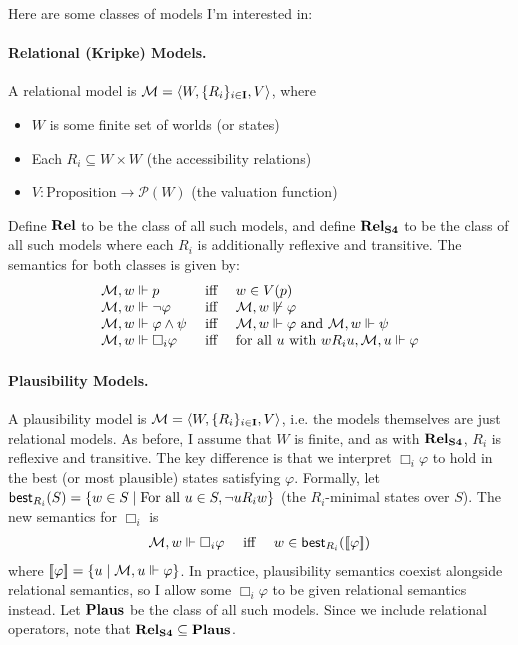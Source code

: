 \documentclass[letterpaper]{article}
\begin{document}
Here are some classes of models I'm interested in:

\paragraph*{Relational (Kripke) Models.} A relational model is $\mathcal{M} = \langle W, \{ R_i \}_{i \in \textbf{I}}, V \rangle$, where 
\begin{itemize}
    \item $W$ is some finite set of worlds (or states)
    \item Each $R_i \subseteq W \times W$ (the accessibility relations)
    \item $V : \textrm{Proposition} \to \mathcal{P}(W)$ (the valuation function)
\end{itemize}
Define $\textrm{\textbf{Rel}}$ to be the class of all such models, and define $\textrm{\textbf{Rel}}_\textrm{\textbf{S4}}$ to be the class of all such models where each $R_i$ is additionally reflexive and transitive.  The semantics for both classes is given by:
\[
\begin{array}{lcl}
    \mathcal{M}, w \Vdash p & \mbox{ iff } & w \in V(p)\\
    \mathcal{M}, w \Vdash \neg \varphi & \mbox{ iff } & \mathcal{M}, w \not \Vdash \varphi\\
    \mathcal{M}, w \Vdash \varphi \land \psi & \mbox{ iff } & \mathcal{M}, w \Vdash \varphi \mbox{ and } \mathcal{M}, w \Vdash \psi\\
    \mathcal{M}, w \Vdash \Box_i \varphi & \mbox{ iff } & \mbox{for all } u \mbox{ with } w{R_i}u, \mathcal{M}, u \Vdash \varphi
\end{array}
\]

\paragraph*{Plausibility Models.}
A plausibility model is $\mathcal{M} = \langle W, \{ R_i \}_{i \in \textbf{I}}, V \rangle$, i.e. the models themselves are just relational models.  As before, I assume that $W$ is finite, and as with $\textrm{\textbf{Rel}}_\textrm{\textbf{S4}}$, $R_i$ is reflexive and transitive.  The key difference is that we interpret $\Box_i \varphi$ to hold in the best (or most plausible) states satisfying $\varphi$.  Formally, let $\mathsf{best}_{R_i}{(S)} = \{ w \in S \mid \textrm{For all } u \in S, \neg u {R_i} w \}$ (the $R_i$-minimal states over $S$).  The new semantics for $\Box_i$ is
\[
\begin{array}{lcl}
    \mathcal{M}, w \Vdash \Box_i \varphi & \mbox{ iff } & w \in \mathsf{best}_{R_i}{([\![\mbox{\em $ \varphi $\/}]\!])}
\end{array}
\]
where $[\![\mbox{\em $ \varphi $\/}]\!] = \{ u \mid \mathcal{M}, u \Vdash \varphi \}$.  In practice, plausibility semantics coexist alongside relational semantics, so I allow some $\Box_i \varphi$ to be given relational semantics instead.  Let $\textrm{\textbf{Plaus}}$ be the class of all such models.  Since we include relational operators, note that $\textrm{\textbf{Rel}}_\textrm{\textbf{S4}} \subseteq \textrm{\textbf{Plaus}}$.
\end{document}
